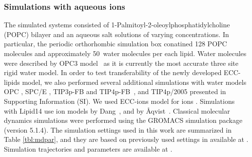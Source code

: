 \documentclass[aip,jcp,twocolumn]{revtex4}
\begin{document}
\subsubsection{Simulations with aqueous ions}
The simulated systems consisted of 1-Palmitoyl-2-oleoylphosphatidylcholine
(POPC) bilayer and an aqueous salt solutions of varying concentrations.
In particular, the periodic orthorhombic simulation box conatined 
128 POPC molecules and approximately 50~water molecules per each lipid.
Water molecules were described by OPC3 model~\cite{Izadi16} 
as it is currently the most accurate three site rigid water model. 
In order to test transferability of the newly developed ECC-lipids model, 
we also performed several additional simulations with water models 
OPC \cite{Izadi14}, SPC/E \cite{Berendsen1987}, TIP3p-FB and TIP4p-FB~\cite{Wang2014}, and TIP4p/2005 \cite{Abascal2005}
presented in Supporting Information (SI). 
We used ECC-ions model for ions \cite{jungwirth17-new-paper-to-be-published, kohagen16, Pluharova2014}.  %
Simulations with Lipid14 use ion models by Dang~\cite{smith94,chang1999,dang2006}, and by \AA{}qvist~\cite{aqvist90}. 
Classical molecular dynamics simulations were performed using the GROMACS \cite{Abraham15} simulation package (version 5.1.4).  
The simulation settings used in this work are 
summarized in Table \ref{tbl:mdpar}, 
and they are based on previously used settings in \cite{catte16} available at \cite{lipid14POPC0mMNaClfiles}.
Simulation trajectories and parameters are available at \cite{??} . 
\end{document}
